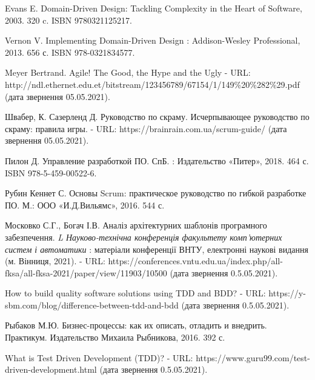 \begingroup
\renewcommand{\section}[2]{\anonsection{Перелік посилань}}
\begin{thebibliography}{00}

      Evans E.
      Domain-Driven Design: Tackling Complexity in the Heart of Software,
      2003. 320 c. ISBN 9780321125217.

      Vernon V.
      Implementing Domain-Driven Design : Addison-Wesley Professional,
      2013. 656 с. ISBN 978-0321834577.

      Meyer Bertrand.
      Agile! The Good, the Hype and the Ugly -
      URL: http://ndl.ethernet.edu.et/bitstream/123456789/67154/1/149\%20\%282\%29.pdf
      (дата звернення 05.05.2021).

      Швабер, К. Сазерленд Д.
      Руководство по скраму. Исчерпывающее руководство по скраму: правила игры. -
      URL: https://brainrain.com.ua/scrum-guide/
      (дата звернення 05.05.2021).

      Пилон Д.
      Управление разработкой ПО. СпБ. : Издательство «Питер»,
      2018. 464 с. ISBN 978-5-459-00522-6.

      Рубин Кеннет С.
      Основы Scrum: практическое руководство по гибкой разработке ПО. М.: ООО «И.Д.Вильямс»,
      2016. 544 с. 

      Московко С.Г., Богач І.В.
      Аналіз архітектурних шаблонів програмного забезпечення.
			\emph{L Науково-технічна конференція факультету комп'ютерних систем і автоматики} :
			матеріали конференції ВНТУ, електронні наукові видання (м. Вінниця, 2021).
      - URL: https://conferences.vntu.edu.ua/index.php/all-fksa/all-fksa-2021/paper/view/11903/10500
			(дата звернення 0.5.05.2021).

			How to build quality software solutions using TDD and BDD? -
			URL: https://y-sbm.com/blog/difference-between-tdd-and-bdd
			(дата звернення 0.5.05.2021).

      Рыбаков М.Ю.
      Бизнес-процессы: как их описать, отладить и внедрить. Практикум.
      Издательство Михаила Рыбникова, 2016. 392 с.

			What is Test Driven Development (TDD)? -
      URL: https://www.guru99.com/test-driven-development.html
			(дата звернення 0.5.05.2021).


\end{thebibliography}
